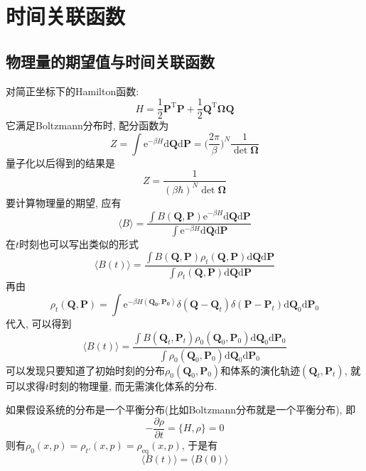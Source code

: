 \chapter{时间关联函数}
    \section{物理量的期望值与时间关联函数}

    对简正坐标下的Hamilton函数:
    \begin{equation}
        H = \frac 12 \bm{P}^\mathrm{T}\bm{P} + \frac 12 \bm{Q}^\mathrm{T} \bm{\Omega Q}
    \end{equation}
    它满足Boltzmann分布时, 配分函数为
    \begin{equation}
        Z = \int \mathrm{e}^{-\beta H} \mathrm{d}\bm{Q}\mathrm{d}\bm{P} = \bigg(\frac {2\pi}{\beta}\bigg)^N \frac 1{\det \bm{\Omega}}
    \end{equation}
    量子化以后得到的结果是
    \begin{equation}
        Z = \frac 1{(\beta \hbar)^N \det \bm{\Omega}}
    \end{equation}
    要计算物理量的期望, 应有
    \begin{equation}
        \langle B \rangle = \frac {\int B(\bm{Q,P})\mathrm{e}^{-\beta H} \mathrm{d}\bm{Q}\mathrm{d}\bm{P}}{\int \mathrm{e}^{-\beta H} \mathrm{d}\bm{Q}\mathrm{d}\bm{P}}
    \end{equation}
    在$t$时刻也可以写出类似的形式
    \begin{equation}
        \langle B(t) \rangle = \frac {\int B(\bm{Q,P}) \rho_t(\bm{Q,P}) \mathrm{d}\bm{Q}\mathrm{d}\bm{P}}{\int \rho_t(\bm{Q,P}) \mathrm{d}\bm{Q}\mathrm{d}\bm{P}}
    \end{equation}
    再由
    \begin{equation}
        \rho_t (\bm{Q,P}) = \int \mathrm{e}^{-\beta H(\bm{Q_0,P_0})} \delta(\bm{Q-Q}_t) \delta(\bm{P-P}_t) \mathrm{d}\bm{Q}_0\mathrm{d}\bm{P}_0
    \end{equation}
    代入, 可以得到
    \begin{equation}
        \langle B(t) \rangle = \frac {\int B(\bm{Q}_t,\bm{P}_t) \rho_0(\bm{Q}_0,\bm{P}_0) \mathrm{d}\bm{Q}_0\mathrm{d}\bm{P}_0}{\int \rho_0(\bm{Q}_0,\bm{P}_0) \mathrm{d}\bm{Q}_0\mathrm{d}\bm{P}_0}
    \end{equation}
    可以发现只要知道了初始时刻的分布$\rho_0(\bm{Q}_0,\bm{P}_0)$和体系的演化轨迹$(\bm{Q}_t,\bm{P}_t)$, 就可以求得$t$时刻的物理量, 而无需演化体系的分布. 

    如果假设系统的分布是一个平衡分布(比如Boltzmann分布就是一个平衡分布), 即
    \begin{equation}
        - \frac {\partial \rho}{\partial t} = \{ H, \rho\} = 0
    \end{equation}
    则有$\rho_0(x,p) = \rho_{t'}(x, p) = \rho_{\mathrm{eq}}(x, p)$, 于是有
    \begin{equation}
        \langle B(t) \rangle = \langle B(0) \rangle
    \end{equation}

